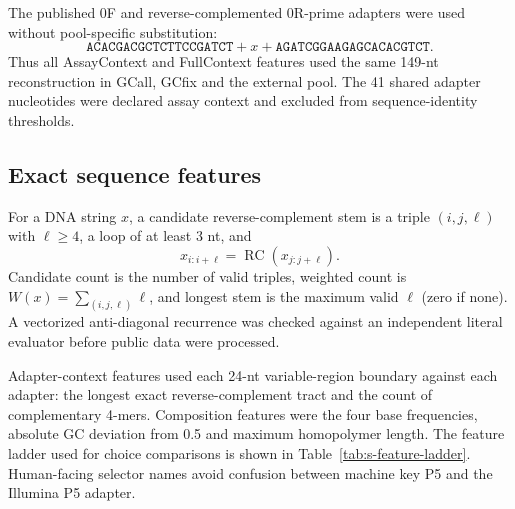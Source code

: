\documentclass[10pt]{article}
\begin{document}
The published 0F and reverse-complemented 0R-prime adapters were used without pool-specific substitution:
\[
 \texttt{ACACGACGCTCTTCCGATCT}+x+
 \texttt{AGATCGGAAGAGCACACGTCT}.
\]
Thus all AssayContext and FullContext features used the same 149-nt reconstruction in GCall, GCfix and the external pool. The 41 shared adapter nucleotides were declared assay context and excluded from sequence-identity thresholds.

\subsection{Exact sequence features}

For a DNA string $x$, a candidate reverse-complement stem is a triple $(i,j,\ell)$ with $\ell\geq4$, a loop of at least 3 nt, and
\[
 x_{i:i+\ell}=\operatorname{RC}(x_{j:j+\ell}).
\]
Candidate count is the number of valid triples, weighted count is $W(x)=\sum_{(i,j,\ell)}\ell$, and longest stem is the maximum valid $\ell$ (zero if none). A vectorized anti-diagonal recurrence was checked against an independent literal evaluator before public data were processed.

Adapter-context features used each 24-nt variable-region boundary against each adapter: the longest exact reverse-complement tract and the count of complementary 4-mers. Composition features were the four base frequencies, absolute GC deviation from 0.5 and maximum homopolymer length. The feature ladder used for choice comparisons is shown in Table~\ref{tab:s-feature-ladder}. Human-facing selector names avoid confusion between machine key P5 and the Illumina P5 adapter.
\end{document}
